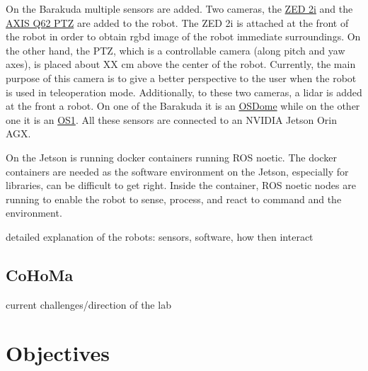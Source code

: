 
On the Barakuda multiple sensors are added.
Two cameras, the \href{https://www.stereolabs.com/en-fr/products/zed-2}{ZED 2i} and the \href{https://www.axis.com/products/axis-q62-series}{AXIS Q62 PTZ}
are added to the robot.
The ZED 2i is attached at the front of the robot in order to obtain \Gls{rgbd} image of the robot immediate surroundings.
On the other hand, the PTZ, which is a controllable camera (along pitch and yaw axes), is placed about XX cm above the center of the
robot.
Currently, the main purpose of this camera is to give a better perspective to the user when the robot is used in
teleoperation mode.
Additionally, to these two cameras, a \Gls{lidar} is added at the front a robot.
On one of the Barakuda it is an \href{https://ouster.com/products/hardware/osdome-lidar-sensor}{OSDome} while on the
other one it is an \href{https://ouster.com/products/hardware/os1-lidar-sensor}{OS1}.
All these sensors are connected to an NVIDIA Jetson Orin AGX\@.


On the Jetson is running docker containers running ROS noetic.
The docker containers are needed as the software environment on the Jetson, especially for libraries, can be difficult
to get right.
Inside the container, ROS noetic nodes are running to enable the robot to sense, process, and react to command and the
environment.




detailed explanation of the robots: sensors, software, how then interact

\subsection{CoHoMa}

current challenges/direction of the lab


\section{Objectives}